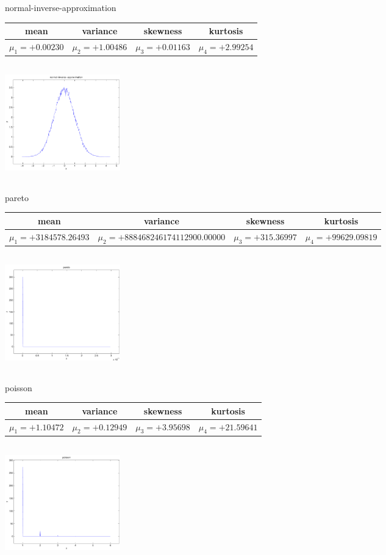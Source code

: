 \documentclass[9pt]{article}
\theoremstyle{plain}
\theoremstyle{definition}
\theoremstyle{remark}
\numberwithin{equation}{section}
\begin{document}
\newpage
normal-inverse-approximation \begin{tabular}{|c|c|c|c|}  mean & variance & skewness & kurtosis \\  \hline
$\mu_1 = +0.00230$ & $\mu_2 = +1.00486$ & $\mu_3 = +0.01163$ & $\mu_4 =+2.99254$ \\
\end{tabular}

\includegraphics[width=5cm,height=5cm]{normal-inverse-approximation.pdf}

pareto \begin{tabular}{|c|c|c|c|}  mean & variance & skewness & kurtosis \\  \hline
$\mu_1 = +3184578.26493$ & $\mu_2 = +888468246174112900.00000$ & $\mu_3 = +315.36997$ & $\mu_4 =+99629.09819$ \\
\end{tabular}

\includegraphics[width=5cm,height=5cm]{pareto.pdf}

poisson \begin{tabular}{|c|c|c|c|}  mean & variance & skewness & kurtosis \\  \hline
$\mu_1 = +1.10472$ & $\mu_2 = +0.12949$ & $\mu_3 = +3.95698$ & $\mu_4 =+21.59641$ \\
\end{tabular}

\includegraphics[width=5cm,height=5cm]{poisson.pdf}
\end{document}
